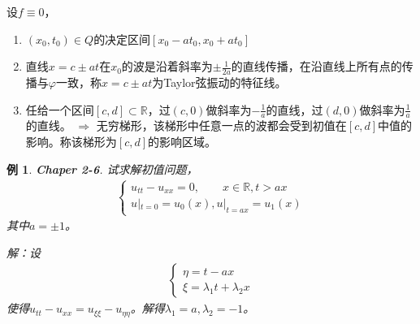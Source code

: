 \documentclass[11pt, a4paper]{article}
\theoremstyle{theorem}
\newtheorem{eg}[thm]{例}
\begin{document}
设$f \equiv 0$，
\begin{enumerate}[(1)]
    \item $(x_0, t_0) \in Q$的决定区间$[x_0 - a t_0, x_0 + at_0]$
    \item 直线$x = c \pm at$在$x_0$的波是沿着斜率为$\pm \frac{1}{2a}$的直线传播，在沿直线上所有点的传播与$\varphi$一致，称$x = c \pm at$为Taylor弦振动的特征线。
    \item 任给一个区间$[c,d] \subset \mathbb{R}$，过$(c,0)$做斜率为$-\frac{1}{a}$的直线，过$(d,0)$做斜率为$\frac{1}{a}$的直线。 $\Longrightarrow$ 无穷梯形，该梯形中任意一点的波都会受到初值在$[c,d]$中值的影响。称该梯形为$[c,d]$的影响区域。
\end{enumerate}

\begin{eg}
\textbf{Chaper 2-6}. 试求解初值问题，
\begin{align}
    \begin{cases}
    u_{tt} - u_{xx} = 0, \quad \quad x \in \mathbb{R}, t >ax \\
    u|_{t=0} = u_0(x), u|_{t = ax} = u_1(x)
    \end{cases}
\end{align}
其中$a = \pm 1$。

解：设
\begin{align*}
    \begin{cases}
    \eta = t - ax \\
    \xi = \lambda_1 t + \lambda_2 x
    \end{cases}
\end{align*}
使得$u_{tt} - u_{xx} = u_{\xi\xi} - u_{\eta\eta}$。解得$\lambda_1 = a, \lambda_2 = -1$。


\end{eg}
\end{document}

